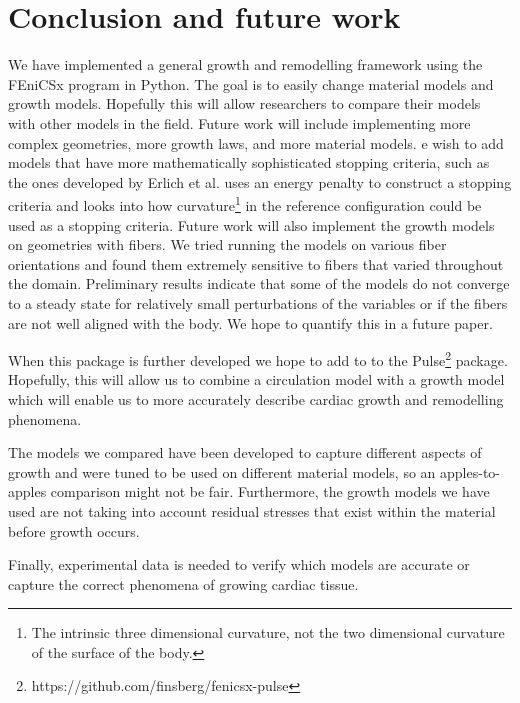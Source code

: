 \section{Conclusion and future work}
We have implemented a general growth and remodelling framework using the FEniCSx program in Python. The goal is to easily change material models and growth models. Hopefully this will allow researchers to compare their models with other models in the field. Future work will include implementing more complex geometries, more growth laws, and more material models.  \cite{Goriely2017}  e wish to add models that have more mathematically sophisticated stopping criteria, such as the ones developed by Erlich et al. \citep{Erlich2023} uses an energy penalty to construct a stopping criteria and \citep{Erlich2024} looks into how curvature\footnote{The intrinsic three dimensional curvature, not the two dimensional curvature of the surface of the body.} in the reference configuration could be used as a stopping criteria. Future work will also implement the growth models on geometries with fibers. We tried running the models on various fiber orientations and found them extremely sensitive to fibers that varied throughout the domain. Preliminary results indicate that some of the models do not converge to a steady state for relatively small perturbations of the variables or if the fibers are not well aligned with the body. We hope to quantify this in a future paper. \par
When this package is further developed we hope to add to to the Pulse\footnote{https://github.com/finsberg/fenicsx-pulse} package. Hopefully, this will allow us to combine a circulation model with a growth model which will enable us to more accurately describe cardiac growth and remodelling phenomena. \par
The models we compared have been developed to capture different aspects of growth and were tuned to be used on different material models, so an apples-to-apples comparison might not be fair. Furthermore, the growth models we have used are not taking into account residual stresses that exist within the material before growth occurs. \par
Finally, experimental data is needed to verify which models are accurate or capture the correct phenomena of growing cardiac tissue.


% 
